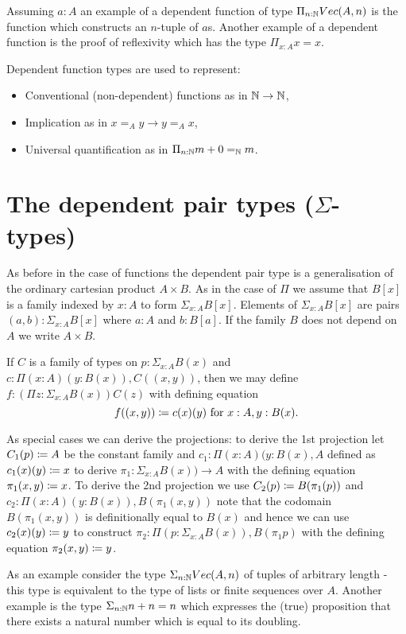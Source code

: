 Assuming $a:A$ an example of a dependent function of type $\Pi_{n:\mathbb{N}}Vec(A,n)$
is the function which constructs an $n$-tuple of $a$s. Another example
of a dependent function is the proof of reflexivity which has the type
$\Pi_{x:A}x = x$.

Dependent function types are used to represent:
\begin{itemize}
\item Conventional (non-dependent) functions as in $\mathbb{N} \to \mathbb{N}$,
\item Implication as in $x =_A y \to y =_A x$,
\item Universal quantification as in $\Pi_{n:\mathbb{N}}m+0 =_\mathbb{N} m$.
\end{itemize}

\section{The dependent pair types ($\Sigma$-types)}
\label{sec:sigma-types}

As before in the case of functions the dependent pair type is a
generalisation of the ordinary cartesian product $A \times B$. 
As in the case of $\Pi$ we assume that $B[x]$ is a family indexed by
$x:A$ to form $\Sigma_{x:A}B[x]$. Elements of $\Sigma_{x:A}B[x]$ are
pairs $(a,b) : \Sigma_{x:A}B[x]$ where $a:A$ and $b:B[a]$. If the
family $B$ does not depend on $A$ we write $A \times B$.

If $C$ is a family of types on $p:\Sigma_{x:A}B(x)$ and 
$c:\Pi(x:A)(y:B(x)),C((x,y))$, then we may define 
$f:(\Pi z:\Sigma_{x:A}B(x))C(z)$ with defining equation
  \[f((x,y))\coloneqq c(x)(y)\mbox{ for } x:A,y:B(x).\]

As special cases we can derive the projections: to derive the 1st
projection let $C_1(p) \coloneqq A$ be the constant family and $c_1 : \Pi (x:A)(y:B(x),A$
defined as $c_1(x)(y) \coloneqq x$ to derive $\pi_1 : \Sigma_{x:A}B(x)) \to A$
with the defining equation $\pi_1 (x,y) \coloneqq x$. To derive the 2nd
projection we use $C_2(p) \coloneqq B (\pi_1(p))$ and $c_2 : \Pi
(x:A)(y:B(x)),B(\pi_1(x,y))$ note that the codomain $B(\pi_1(x,y))$ is
definitionally equal to $B(x)$ and hence we can use $c_2(x)(y) \coloneqq
y$ to construct $\pi_2 : \Pi(p : \Sigma_{x:A}{B(x)}),B(\pi_1 p)$ with
the defining equation $\pi_2(x,y) \coloneqq y$.

As an example consider the type $\Sigma_{n:\mathbb{N}}Vec(A,n)$ of tuples of
arbitrary length - this type is equivalent to the type of lists or
finite sequences over $A$. Another example is the type
$\Sigma_{n:\mathbb{N}}n+n = n$ which expresses the (true) proposition that
there exists a natural number which is equal to its doubling.

